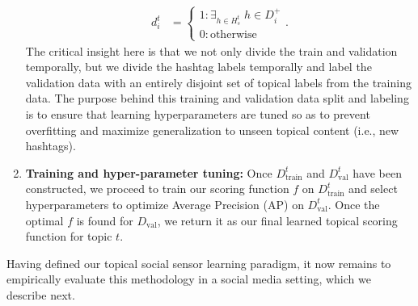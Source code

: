\begin{enumerate}
\begin{align*}
d_{i}^{t} & =
  \begin{cases}
    1: \exists_{h \in H^t_s} \; h \in D_i^+ \\
    0: \mathrm{otherwise}
  \end{cases} .
\end{align*}
The critical insight here is that we not only divide the train and validation
temporally, but we divide the hashtag labels temporally and label the validation
data with an entirely disjoint set of topical labels from the training data.
The purpose behind this training and validation data split
and labeling is to ensure that learning hyperparameters are tuned so as
to prevent overfitting and maximize generalization to unseen topical
content (i.e., new hashtags).
\item {\bf Training and hyper-parameter tuning:}
Once $D^t_\mathrm{train}$ and $D^t_\mathrm{val}$ have been constructed,
we proceed to train our scoring function $f$ on $D^t_\mathrm{train}$ and
select hyperparameters to optimize Average Precision (AP) on
$D^t_\mathrm{val}$.  Once the optimal $f$ is found for $D_\mathrm{val}$,
we return it as our final learned topical scoring function for topic $t$.
\end{enumerate}
Having defined our topical social sensor learning paradigm, it now remains
to empirically evaluate this methodology in a social media setting, which
we describe next.
